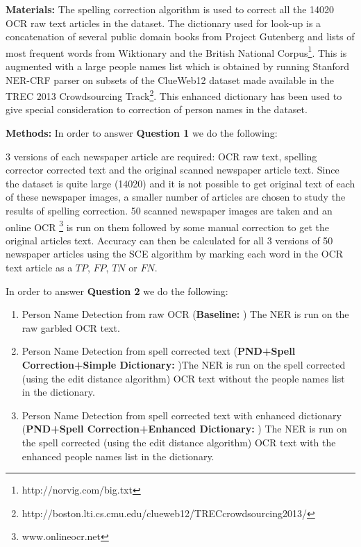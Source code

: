 \documentclass[letterpaper,11pt]{report}
\begin{document}
\noindent \textbf{Materials: }
The spelling correction algorithm is used to correct all the 14020 OCR raw text articles in the dataset. The dictionary used for look-up is a concatenation of several public domain books from Project Gutenberg and lists of most frequent words from Wiktionary and the British National Corpus\footnote{http://norvig.com/big.txt}. This is augmented with a large people names list which is obtained  by running Stanford NER-CRF parser on subsets of the ClueWeb12 dataset made available in the TREC 2013 Crowdsourcing Track\footnote{http://boston.lti.cs.cmu.edu/clueweb12/TRECcrowdsourcing2013/}. This enhanced dictionary has been used to give special consideration to correction of person names in the dataset.

\noindent \textbf{Methods: }
In order to answer \textbf{Question 1} we do the following: 

3 versions of each newspaper article are required: OCR raw text, spelling corrector corrected text and the original scanned newspaper article text. Since the dataset is quite large (14020) and it is not possible to get original text of each of these newspaper images, a smaller number of articles are chosen to study the results of spelling correction. 50 scanned newspaper images are taken and an online OCR \footnote{www.onlineocr.net} is run on them followed by some manual correction to get the original articles text. Accuracy can then be calculated for all 3 versions of 50 newspaper articles using the SCE algorithm by marking each word in the OCR text article as a $TP$, $FP$, $TN$ or $FN$. 

In order to answer \textbf{Question 2} we do the following: 
\begin{enumerate}
\item Person Name Detection from raw OCR (\textbf{Baseline: }) The NER is run on the raw garbled OCR text.
\item Person Name Detection from spell corrected text (\textbf{PND+Spell Correction+Simple Dictionary: })The NER is run on the spell corrected (using the edit distance algorithm) OCR text without the people names list in the dictionary.
\item Person Name Detection from spell corrected text with enhanced dictionary (\textbf{PND+Spell Correction+Enhanced Dictionary: }) The NER is run on the spell corrected (using the edit distance algorithm) OCR text with the enhanced people names list in the dictionary.

\end{enumerate}
\end{document}
